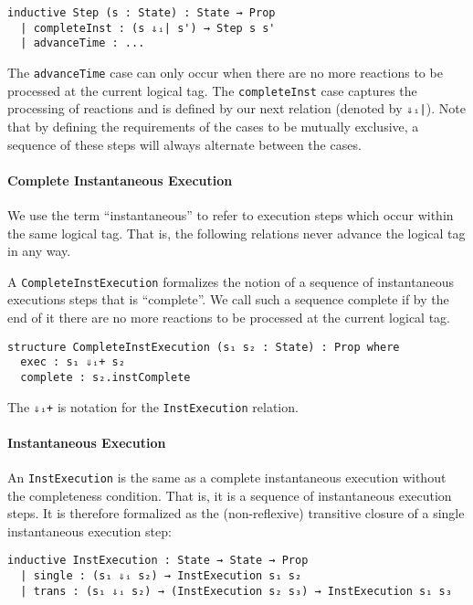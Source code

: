 \begin{lstlisting}
inductive Step (s : State) : State → Prop 
  | completeInst : (s ⇓ᵢ| s') → Step s s'
  | advanceTime : ...
\end{lstlisting}

The \lstinline{advanceTime} case can only occur when there are no more reactions to be processed at the current logical tag.
The \lstinline{completeInst} case captures the processing of reactions and is defined by our next relation (denoted by \lstinline{⇓ᵢ|}).
Note that by defining the requirements of the cases to be mutually exclusive, a sequence of these steps will always alternate between the cases.

\paragraph{Complete Instantaneous Execution}

We use the term ``instantaneous'' to refer to execution steps which occur within the same logical tag.
That is, the following relations never advance the logical tag in any way.

A \lstinline{CompleteInstExecution} formalizes the notion of a sequence of instantaneous executions steps that is ``complete''.
We call such a sequence complete if by the end of it there are no more reactions to be processed at the current logical tag.

\begin{lstlisting}
structure CompleteInstExecution (s₁ s₂ : State) : Prop where
  exec : s₁ ⇓ᵢ+ s₂
  complete : s₂.instComplete
\end{lstlisting}

The \lstinline{⇓ᵢ+} is notation for the \lstinline{InstExecution} relation.

\paragraph{Instantaneous Execution}

An \lstinline{InstExecution} is the same as a complete instantaneous execution without the completeness condition.
That is, it is a sequence of instantaneous execution steps.
It is therefore formalized as the (non-reflexive) transitive closure of a single instantaneous execution step:

\begin{lstlisting}
inductive InstExecution : State → State → Prop 
  | single : (s₁ ⇓ᵢ s₂) → InstExecution s₁ s₂
  | trans : (s₁ ⇓ᵢ s₂) → (InstExecution s₂ s₃) → InstExecution s₁ s₃
\end{lstlisting}

